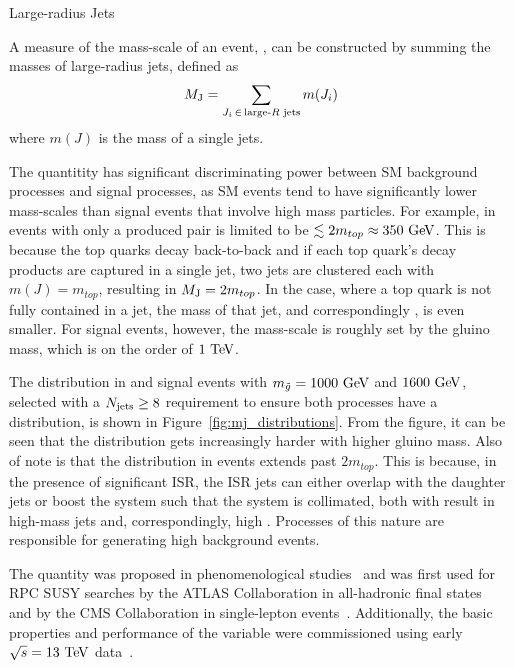 \begin{section}{Large-radius Jets}
\begin{subsection}{\MJ}

A measure of the mass-scale of an event, \MJ, can be constructed by summing the masses of large-radius jets, defined as
\begin{align}
M_{\mathrm{J}} = \sum_{J_{i}\, \in\, {\text{large-}R\text{ jets}}} m(J_i)
\end{align}
where $m(J)$ is the mass of a single \largeR jets.

The quantitity \MJ has significant discriminating power between SM background processes and signal processes, as SM events tend to have significantly lower mass-scales than signal events that involve high mass particles.
For example, \MJ in events with only a produced \ttbar pair is limited to be $\lesssim 2m_{top} \approx 350~\mathrm{Ge\kern -0.1em V}$.
This is because the top quarks decay back-to-back and if each top quark's decay products are captured in a single \largeR jet, two \largeR jets are clustered each with $m(J) = m_{top}$, resulting in $M_{\mathrm{J}} = 2m_{top}$.
In the case, where a top quark is not fully contained in a \largeR jet, the mass of that \largeR jet, and correspondingly \MJ, is even smaller.
For signal events, however, the mass-scale is roughly set by the gluino mass, which is on the order of $1~\mathrm{Te\kern -0.1em V}$.

The \MJ distribution in \ttbar and signal events with $m_{\tilde{g}} = 1000~\mathrm{Ge\kern -0.1em V}$ and $1600~\mathrm{Ge\kern -0.1em V}$, selected with a $N_{\mathrm{jets}} \geq 8$ requirement to ensure both processes have a \Njets distribution, is shown in Figure~\ref{fig:mj_distributions}. 
From the figure, it can be seen that the \MJ distribution gets increasingly harder with higher gluino mass.
Also of note is that the \MJ distribution in \ttbar events extends past $2m_{top}$.
This is because, in the presence of significant ISR, the ISR jets can either overlap with the \ttbar daughter jets or boost the \ttbar system such that the system is collimated, both with result in high-mass \largeR jets and, correspondingly, high \MJ.
Processes of this nature are responsible for generating high \MJ background events.

The quantity \MJ was proposed in phenomenological studies~\cite{Hook:2012fd,Cohen:2012yc,Hedri:2013pvl} and was first used for RPC SUSY searches by the ATLAS Collaboration in all-hadronic final states~\cite{Aad:2015lea,Aad:2013wta} and by the CMS Collaboration in single-lepton events~\cite{Khachatryan:2016uwr,Sirunyan:2017fsj}.
Additionally, the basic properties and performance of the \MJ variable were commissioned using early $\sqrt{s} = 13~\mathrm{Te\kern -0.1em V}$ data~\cite{CMS-DP-2015-035}.


\end{subsection}
\end{section}
